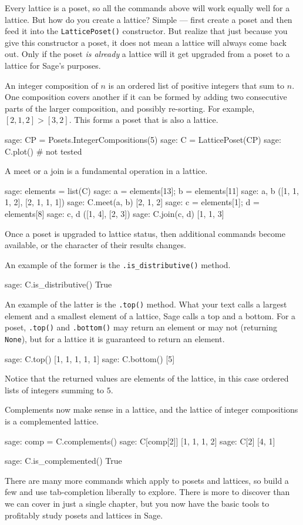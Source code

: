 %
%
Every lattice is a poset, so all the commands above will work equally well for a lattice.  But how do you create a lattice?  Simple --- first create a poset and then feed it into the \verb?LatticePoset()? constructor.  But realize that just because you give this constructor a poset, it does not mean a lattice will always come back out.  Only if the poset \emph{is already} a lattice will it get upgraded from a poset to a lattice for Sage's purposes.\par
%
An integer composition of $n$ is an ordered list of positive integers that sum to $n$.  One composition covers another if it can be formed by adding two consecutive parts of the larger composition, and possibly re-sorting.  For example, $[2, 1, 2] > [3, 2]$.  This forms a poset that is also a lattice.
%
\begin{sageexample}
sage: CP = Posets.IntegerCompositions(5)
sage: C = LatticePoset(CP)
sage: C.plot()    # not tested
\end{sageexample}
%
A meet or a join is a fundamental operation in a lattice.
%
%
\begin{sageexample}
sage: elements = list(C)
sage: a = elements[13]; b = elements[11]
sage: a, b
([1, 1, 1, 2], [2, 1, 1, 1])
sage: C.meet(a, b)
[2, 1, 2]
sage: c = elements[1]; d = elements[8]
sage: c, d
([1, 4], [2, 3])
sage: C.join(c, d)
[1, 1, 3]
\end{sageexample}
%
Once a poset is upgraded to lattice status, then additional commands become available, or the character of their results changes.\par
%
An example of the former is the \verb?.is_distributive()?  method.
%
\begin{sageexample}
sage: C.is_distributive()
True
\end{sageexample}
%
An example of the latter is the \verb?.top()?  method.  What your text calls a largest element and a smallest element of a lattice, Sage calls a top and a bottom.  For a poset, \verb?.top()? and \verb?.bottom()? may return an element or may not (returning \verb?None?), but for a lattice it is guaranteed to return an element.
%
\begin{sageexample}
sage: C.top()
[1, 1, 1, 1, 1]
sage: C.bottom()
[5]
\end{sageexample}
%
Notice that the returned values are elements of the lattice, in this case ordered lists of integers summing to $5$.\par
%
Complements now make sense in a lattice, and the lattice of integer compositions is a complemented lattice.
%
\begin{sageexample}
sage: comp = C.complements()
sage: C[comp[2]]
[1, 1, 1, 2]
sage: C[2]
[4, 1]
\end{sageexample}
%
\begin{sageexample}
sage: C.is_complemented()
True
\end{sageexample}
%
There are many more commands which apply to posets and lattices, so build a few and use tab-completion liberally to explore.  There is more to discover than we can cover in just a single chapter, but you now have the basic tools to profitably study posets and lattices in Sage.
%
